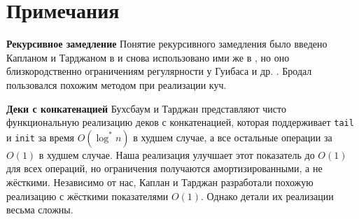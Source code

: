 \section{Примечания}
\label{sc:11.3}

\noindent
\textbf{Рекурсивное замедление} Понятие рекурсивного замедления было
введено Капланом и Тарджаном в \cite{KaplanTarjan1995} и снова
использовано ими же в \cite{KaplanTarjan1996b}, но оно
близкородственно ограничениям регулярности у Гуибаса и
др. \cite{Guibas-etal1977}. Бродал \cite{Brodal1995} пользовался
похожим методом при реализации куч.

\textbf{Деки с конкатенацией} Бухсбаум и Тарджан
\cite{BuchsbaumTarjan1995} представляют чисто функциональную
реализацию деков с конкатенацией, которая поддерживает
\lstinline!tail! и \lstinline!init! за время $O(\log^* n)$ в худшем
случае, а все остальные операции за $O(1)$ в худшем случае. Наша
реализация улучшает этот показатель до $O(1)$ для всех операций, но
ограничения получаются амортизированными, а не жёсткими. Независимо от
нас, Каплан и Тарджан разработали похожую реализацию с жёсткими
показателями $O(1)$. Однако детали их реализации весьма сложны.


